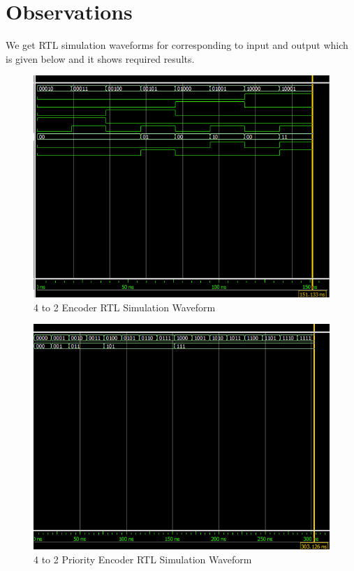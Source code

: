 \documentclass[12pt]{article}
\begin{document}
\section{Observations}
 
We get RTL simulation waveforms for corresponding to input and output which is given below and it shows required results.

\begin{figure}[H]
\centering
  \includegraphics[scale=0.45]{Images/4to2ENCODER_RTLSIMULATION.png}
  \caption{4 to 2 Encoder RTL Simulation Waveform}
\end{figure}

\begin{figure}[H]
\centering
  \includegraphics[scale=0.45]{Images/PriorityEnc_RTLSIMULATION.png}
  \caption{4 to 2 Priority Encoder RTL Simulation Waveform}
\end{figure}
\end{document}
